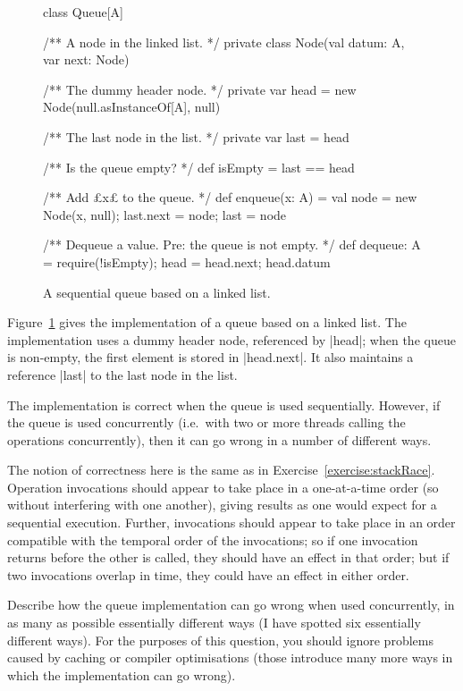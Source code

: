 \begin{question}
\begin{figure}
\begin{scala}
class Queue[A]{
  /** A node in the linked list. */
  private class Node(val datum: A, var next: Node)

  /** The dummy header node. */
  private var head = new Node(null.asInstanceOf[A], null)

  /** The last node in the list. */
  private var last = head

  /** Is the queue empty? */
  def isEmpty = last == head

  /** Add £x£ to the queue. */
  def enqueue(x: A) = {
    val node = new Node(x, null); last.next = node; last = node
  }

  /** Dequeue a value.  Pre: the queue is not empty. */
  def dequeue: A = {
    require(!isEmpty); head = head.next; head.datum
  }
}
\end{scala}
\caption{A sequential queue based on a linked list.}
\label{fig:queue}
\end{figure}

Figure~\ref{fig:queue} gives the implementation of a queue based on a linked
list.  The implementation uses a dummy header node, referenced by |head|; when
the queue is non-empty, the first element is stored in |head.next|.  It also
maintains a reference |last| to the last node in the list.

The implementation is correct when the queue is used sequentially.
However, if the queue is used concurrently (i.e.~with two or more threads
calling the operations concurrently), then it can go wrong in a number of
different ways.  

The notion of correctness here is the same as in
Exercise~\ref{exercise:stackRace}.  Operation invocations should appear to
take place in a one-at-a-time order (so without interfering with one another),
giving results as one would expect for a sequential execution.  Further,
invocations should appear to take place in an order compatible with the
temporal order of the invocations; so if one invocation returns before the
other is called, they should have an effect in that order; but if two
invocations overlap in time, they could have an effect in either order.


%
Describe how the queue implementation can go wrong when used concurrently, in
as many as possible essentially different ways (I have spotted six essentially
different ways).
%
For the purposes of this question, you should ignore problems caused by
caching or compiler optimisations (those introduce many more ways in which the
implementation can go wrong).
\end{question}

